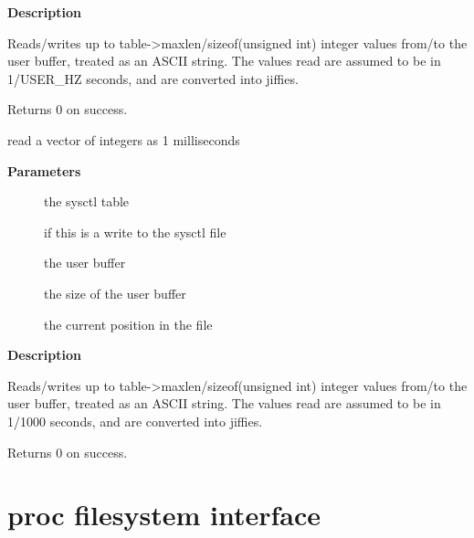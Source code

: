 \documentclass[a4paper,8pt,english]{sphinxmanual}
\begin{document}
\textbf{Description}

Reads/writes up to table-\textgreater{}maxlen/sizeof(unsigned int) integer
values from/to the user buffer, treated as an ASCII string.
The values read are assumed to be in 1/USER\_HZ seconds, and
are converted into jiffies.

Returns 0 on success.

\begin{fulllineitems}
\label{filesystems/index:c.proc_dointvec_ms_jiffies}
read a vector of integers as 1 milliseconds

\end{fulllineitems}


\textbf{Parameters}
\begin{description}
\item[{}] \leavevmode
the sysctl table

\item[{}] \leavevmode
{} if this is a write to the sysctl file

\item[{}] \leavevmode
the user buffer

\item[{}] \leavevmode
the size of the user buffer

\item[{}] \leavevmode
the current position in the file

\end{description}

\textbf{Description}

Reads/writes up to table-\textgreater{}maxlen/sizeof(unsigned int) integer
values from/to the user buffer, treated as an ASCII string.
The values read are assumed to be in 1/1000 seconds, and
are converted into jiffies.

Returns 0 on success.


\section{proc filesystem interface}
\label{filesystems/index:proc-filesystem-interface}
\end{document}
